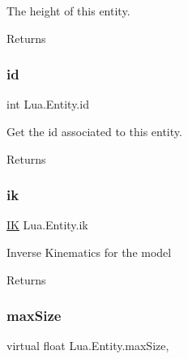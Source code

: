 The height of this entity. 

\begin{DoxyReturn}{Returns}

\end{DoxyReturn}
\mbox{\label{class_lua_1_1_entity_a7776e8422e86d2ab5670ca314a65aab5}} 
\subsubsection{\texorpdfstring{id}{id}}
{\footnotesize\ttfamily int Lua.\+Entity.\+id\hspace{0.3cm}{\ttfamily [get]}}



Get the id associated to this entity. 

\begin{DoxyReturn}{Returns}

\end{DoxyReturn}
\mbox{\label{class_lua_1_1_entity_a42cd1e5e507a1e79eb1161799564da88}} 
\subsubsection{\texorpdfstring{ik}{ik}}
{\footnotesize\ttfamily \mbox{\hyperlink{class_lua_1_1_i_k}{IK}} Lua.\+Entity.\+ik\hspace{0.3cm}{\ttfamily [get]}}



Inverse Kinematics for the model 

\begin{DoxyReturn}{Returns}

\end{DoxyReturn}
\mbox{\label{class_lua_1_1_entity_a133133afe701b7ca4f0e2d6632beae33}} 
\subsubsection{\texorpdfstring{maxSize}{maxSize}}
{\footnotesize\ttfamily virtual float Lua.\+Entity.\+max\+Size\hspace{0.3cm}{\ttfamily [get]}, {\ttfamily [set]}}



